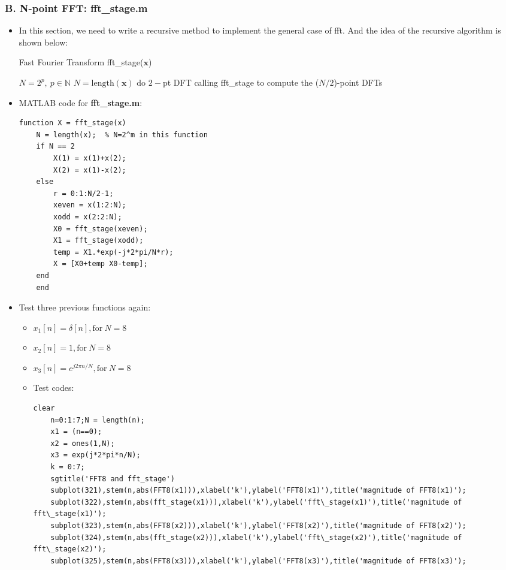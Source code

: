 \documentclass[onecolumn,oneside]{SUSTechHomework}
\begin{document}
\subsubsection*{B. N-point FFT: fft\_stage.m}
\begin{itemize}
	\item In this section, we need to write a recursive method to implement the general case of fft. 
	And the idea of the recursive algorithm is shown below:
	\begin{algorithm}[H]
		\caption{Fast Fourier Transform fft\_stage($\mathbf{x}$)}
		\label{alg1}
		\begin{algorithmic}
		\REQUIRE $N = 2^p,\ p\in \mathbb{N}$
		\ENSURE $N=\text{length}(\mathbf{x})$
		\STATE do $2-$pt DFT
		\ELSE
		\STATE calling fft\_stage to compute the ($N/2$)-point DFTs
		\ENDIF
	 	\end{algorithmic}
	\end{algorithm}
	\item MATLAB code for \textbf{fft\_stage.m}:
\begin{lstlisting}[title=\textbf{fft\_stage.m}]
	function X = fft_stage(x)
	N = length(x);  % N=2^m in this function
	if N == 2
		X(1) = x(1)+x(2);
		X(2) = x(1)-x(2);
	else
		r = 0:1:N/2-1;
		xeven = x(1:2:N);
		xodd = x(2:2:N);
		X0 = fft_stage(xeven);
		X1 = fft_stage(xodd);
		temp = X1.*exp(-j*2*pi/N*r);
		X = [X0+temp X0-temp]; 
	end
	end
\end{lstlisting}
	\item Test three previous functions again:
	\begin{itemize}
		\item $x_1[n]=\delta[n], \text{for}\ N=8$
		\item $x_2[n]=1, \text{for}\ N=8$
		\item $x_3[n]=e^{j2\pi n/N}, \text{for}\ N=8$
		\item Test codes:
\begin{lstlisting}[title=\textbf{q5\_3\_2b.m}]
	clear
	n=0:1:7;N = length(n);
	x1 = (n==0);
	x2 = ones(1,N);
	x3 = exp(j*2*pi*n/N);
	k = 0:7;
	sgtitle('FFT8 and fft_stage')
	subplot(321),stem(n,abs(FFT8(x1))),xlabel('k'),ylabel('FFT8(x1)'),title('magnitude of FFT8(x1)');
	subplot(322),stem(n,abs(fft_stage(x1))),xlabel('k'),ylabel('fft\_stage(x1)'),title('magnitude of fft\_stage(x1)');
	subplot(323),stem(n,abs(FFT8(x2))),xlabel('k'),ylabel('FFT8(x2)'),title('magnitude of FFT8(x2)');
	subplot(324),stem(n,abs(fft_stage(x2))),xlabel('k'),ylabel('fft\_stage(x2)'),title('magnitude of fft\_stage(x2)');
	subplot(325),stem(n,abs(FFT8(x3))),xlabel('k'),ylabel('FFT8(x3)'),title('magnitude of FFT8(x3)');

\end{lstlisting}
\end{itemize}
\end{itemize}
\end{document}
